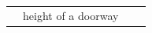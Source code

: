 {\begin{tabular}[t]{|l|l|l|l|}
    
     \tabularnewline\cline{1-1}\cline{2-2}\cline{3-3}\cline{4-4}
    
    
         &
    
    
        height of a doorway &
    
    
         &
    
    
     \tabularnewline\cline{1-1}\cline{2-2}\cline{3-3}\cline{4-4}
    \end{tabular}} %
